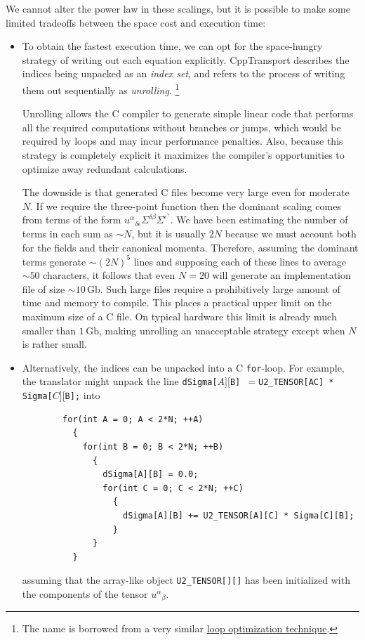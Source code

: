 \documentclass[11pt,a4paper]{article}
\newcommand{\packagefont}{\sffamily}
\newcommand{\CppTransport}{{\packagefont CppTransport}}
\newcommand{\Gb}{\,\mathrm{Gb}}
\newcommand\CC{C\nolinebreak\hspace{-.05em}\raisebox{.4ex}{\relsize{-3}{\textbf{+}}}\nolinebreak\hspace{-.10em}\raisebox{.4ex}{\relsize{-3}{\textbf{+}}}}
\begin{document}
We cannot alter the power law in these scalings,
but it is possible to
make some limited tradeoffs between the space cost and execution time:
\begin{itemize}
    \item To obtain the fastest execution time, we can opt for the
    space-hungry strategy of writing out each equation explicitly.
    {\CppTransport} describes the indices being unpacked as an
    \emph{index set}, and refers to the process of writing them
    out sequentially as \emph{unrolling}.%
    	\footnote{The name is borrowed from a very similar
    	\href{https://en.wikipedia.org/wiki/Loop_unrolling}{loop optimization technique}.}
    	    
    Unrolling allows the {\CC} compiler to generate simple linear code
    that performs all the required computations without branches
    or jumps, which would be required by loops
    and may incur performance penalties.
    Also,
    because this strategy is completely explicit it maximizes
    the compiler's opportunities to optimize away redundant calculations.
    
    The downside is that generated {\CC} files become
    very large even for moderate $N$.
    If we require the three-point function
    then the dominant scaling comes from terms of the form
    ${u^\alpha}_{\delta\epsilon} \Sigma^{\delta\beta} \Sigma^{\epsilon^\gamma}$.
    We have been estimating the number of terms in each sum as $\sim N$,
    but it is usually $2N$ because we must account both for
    the fields and their canonical momenta.
    Therefore,
    assuming the dominant terms generate $\sim (2N)^5$ lines
    and supposing each of these lines to average $\sim 50$ characters,
    it follows that even $N = 20$ will generate an implementation file of
    size $\sim 10 \Gb$.
    Such large files require a prohibitively large amount of time and memory to compile.
    This places a practical upper limit on the maximum size of a {\CC} file.
    On typical hardware this limit is already much smaller than $1 \Gb$,
    making unrolling an unacceptable strategy except when $N$ is rather small.
    
    \item Alternatively, the indices can be unpacked into a
    {\CC} \texttt{for}-loop.
    For example, the translator
    might unpack the line
    \texttt{dSigma[$A][$B] $= $U2_TENSOR[AC] * Sigma[$C][$B];}
    into
    \begin{verbatim}
        for(int A = 0; A < 2*N; ++A)
          {
            for(int B = 0; B < 2*N; ++B)
              {
                dSigma[A][B] = 0.0;
                for(int C = 0; C < 2*N; ++C)
                  {
                    dSigma[A][B] += U2_TENSOR[A][C] * Sigma[C][B];
                  }
              }
          }
    \end{verbatim}
    assuming that the array-like object
    \texttt{U2_TENSOR[][]} has been initialized with the
    components of the tensor ${u^\alpha}_\beta$.


\end{itemize}
\end{document}
